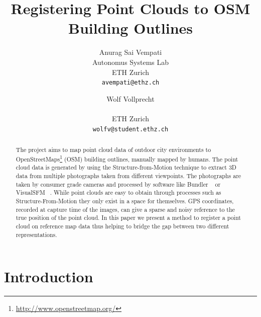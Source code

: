 \documentclass[10pt,twocolumn,letterpaper]{article}
\begin{document}
\title{Registering Point Clouds to OSM Building Outlines}

\author{Anurag Sai Vempati\\
Autonomus Systems Lab\\ ETH Zurich\\
{\tt\small avempati@ethz.ch}
\and
Wolf Vollprecht\\
\\ ETH Zurich
\\
{\tt\small wolfv@student.ethz.ch}
}

\maketitle

\begin{abstract}
  The project aims to map point cloud data of outdoor city environments to OpenStreetMaps\footnote{\url{http://www.openstreetmap.org/}} (OSM) building outlines, manually mapped by humans. The point cloud data is generated by using the Structure-from-Motion technique to extract 3D data from multiple photographs taken from different viewpoints. The photographs are taken by consumer grade cameras and processed by software like Bundler ~\cite{snavely2006photo} or VisualSFM ~\cite{visualsfm2011visual}. While point clouds are easy to obtain through processes such as Structure-From-Motion they only exist in a space for themselves. GPS coordinates, recorded at capture time of the images, can give a sparse and noisy reference to the true position of the point cloud. In this paper we present a method to register a point cloud on reference map data thus helping to bridge the gap between two different representations.
\end{abstract}

\section{Introduction}
\end{document}
